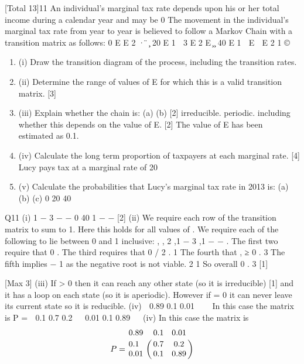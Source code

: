 \documentclass[a4paper,12pt]{article}
\begin{document}
[Total 13]11
An individual’s marginal tax rate depends upon his or her total income during a
calendar year and may be 0%
The movement in the individual’s marginal tax rate from year to year is believed to
follow a Markov Chain with a transition matrix as follows:
0%
E
E 2 ·
 ̈
 ̧
20%
E
1  3 E
2 E  ̧
 ̧
40%
E
1  E  E 2 1
©

\begin{enumerate}
    \item (i) Draw the transition diagram of the process, including the transition rates.
\item (ii) Determine the range of values of E for which this is a valid transition matrix.
[3]
\item (iii) Explain whether the chain is:
(a)
(b)
[2]
irreducible.
periodic.
including whether this depends on the value of E.
[2]
The value of E has been estimated as 0.1.
\item (iv)
Calculate the long term proportion of taxpayers at each marginal rate.
[4]
Lucy pays tax at a marginal rate of 20%
\item (v)
Calculate the probabilities that Lucy’s marginal tax rate in 2013 is:
(a)
(b)
(c)
0%
20%
40%

\end{enumerate}





Q11
(i)
1 − 3%
\beta
{}\beta
{} − \beta −
0%
40%
1 − \beta − 
[2]
(ii)
We require each row of the transition matrix to sum to 1. 
Here this holds for all values of \beta . 
We require each of the following to lie between 0 and 1 inclusive:
\beta ,  , 2 \beta ,1 − 3 \beta ,1 − \beta −  .
The first two require that 0 \leq \beta {} . 
The third requires that 0 \leq \beta {}/ 2 . 
1
The fourth that \beta \leq , \beta ≥ 0 .
3 
The fifth implies \beta {} − 1
as the negative root is not viable.
2
1
So overall 0 \leq \beta \leq .
3
[1]

[Max 3]
(iii)
If \beta > 0 then it can reach any other state (so it is irreducible) [1]
and it has a loop on each state (so it is aperiodic). 
However if \beta = 0 it can never leave its current state so it is reducible. 
(iv)
 0.89 0.1 0.01 


In this case the matrix is P =  0.1 0.7 0.2 
 0.01 0.1 0.89 

(iv) In this case the matrix is 
\[P =
\bordermatrix{0.89 & 0.1 & 0.01 \cr
0.1 & 0.7 & 0.2 \cr
0.01 & 0.1 & 0.89 \cr }
\]
\end{document}
